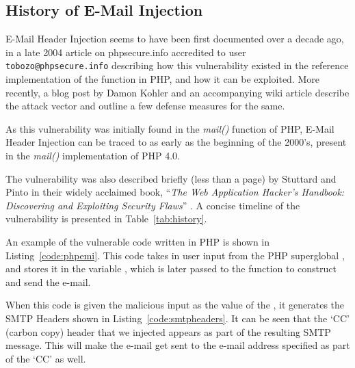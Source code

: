 \subsection{History of E-Mail Injection}

E-Mail Header Injection seems to have been first documented over a decade ago, in a late 2004 article on phpsecure.info \cite{Tobozo} accredited to user \lstinline|tobozo@phpsecure.info| describing how this vulnerability existed in the reference implementation of the  function in PHP, and how it can be exploited. More recently, a blog post by Damon Kohler \cite{DK} and an accompanying wiki article \cite{Injection} describe the attack vector and outline a few defense measures for the same.

As this vulnerability was initially found in the \emph{mail()} function of PHP, E-Mail Header Injection can be traced to as early as the beginning of the 2000's, present in the \emph{mail()} implementation of PHP 4.0. 

The vulnerability was also described briefly (less than a page) by Stuttard and Pinto in their widely acclaimed book, ``\emph{The Web Application Hacker's Handbook: Discovering and Exploiting Security Flaws}'' \cite{stuttard2011web}. 
A concise timeline of the vulnerability is presented in Table~\ref{tab:history}.

An example of the vulnerable code written in PHP is shown in Listing~\ref{code:phpemi}. This code takes in user input from the PHP superglobal , and stores it in the variable , which is later passed to the  function to construct and send the e-mail.

	
When this code is given the malicious input  as the value of the , it generates the SMTP Headers shown in Listing~\ref{code:smtpheaders}. It can be seen that the `CC' (carbon copy) header that we injected appears as part of the resulting SMTP message. This will make the e-mail get sent to the e-mail address specified as part of the `CC' as well.


